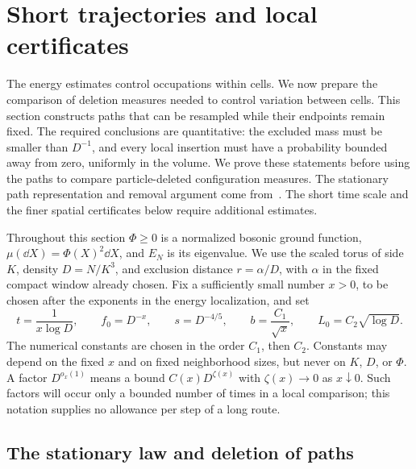 \section{Short trajectories and local certificates}\label{lp:section}\label{sec:local-paths}

The energy estimates control occupations within cells.  We now prepare
the comparison of deletion measures needed to control variation between
cells.  This section constructs paths that can be resampled while
their endpoints remain fixed.  The required conclusions are quantitative:
the excluded mass must be smaller than $D^{-1}$, and every local insertion
must have a probability bounded away from zero, uniformly in the volume.
We prove these statements before using the paths to compare particle-deleted
configuration measures.  The stationary path representation and removal
argument come from~\cite[Section~4]{H}.
The short time scale and the finer spatial certificates below require
additional estimates.

Throughout this section $\Phi\geq0$ is a normalized bosonic ground function,
$\mu(\dd X)=\Phi(X)^2\dd X$, and $E_N$ is its eigenvalue.  We use the
scaled torus of side $K$, density $D=N/K^3$, and exclusion distance
$r=\alpha/D$, with $\alpha$ in the fixed compact window already chosen.
Fix a sufficiently small number $x>0$, to be chosen after the exponents
in the energy localization, and set
\begin{equation}\label{lp:scales}
 t=\frac1{x\log D},\qquad f_0=D^{-x},\qquad s=D^{-4/5},
 \qquad b=\frac{C_1}{\sqrt{x}},\qquad L_0=C_2\sqrt{\log D}.
\end{equation}
The numerical constants are chosen in the order $C_1$, then $C_2$.
Constants may depend on the fixed $x$ and on fixed neighborhood sizes,
but never on $K$, $D$, or $\Phi$.  A factor $D^{o_x(1)}$ means a bound
$C(x)D^{\zeta(x)}$ with $\zeta(x)\to0$ as $x\downarrow0$.
Such factors will occur only a bounded number of times in a local
comparison; this notation supplies no allowance per step of a long route.

\subsection{The stationary law and deletion of paths}

